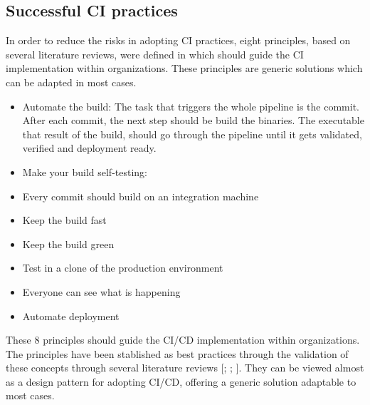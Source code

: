 \subsection{Successful CI practices}
\label{ci-successful-pract}

In order to reduce the risks in adopting CI practices, eight principles, based on several literature reviews, were defined in \citep{Rejstrom2016} which should guide the CI implementation within organizations. These principles are generic solutions which can be adapted in most cases.

\begin{itemize}
\item Automate the build: The task that triggers the whole pipeline is the commit. After each commit, the next step should be build the binaries. The executable that result of the build, should go through the pipeline until it gets validated, verified and deployment ready.
\item Make your build self-testing: 
\item Every commit should build on an integration machine
\item Keep the build fast
\item Keep the build green
\item Test in a clone of the production environment
\item Everyone can see what is happening
\item Automate deployment
\end{itemize}

These 8 principles should guide the CI/CD implementation within organizations. The principles have been stablished as best practices through the validation of these concepts through several literature reviews [\cite{Rodriguez2016}; \cite{Mantyla2015}; \cite{Stahl2014}]. They can be viewed almost as a design pattern for adopting CI/CD, offering a generic solution adaptable to most cases.